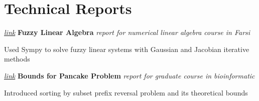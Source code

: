 \section{Technical Reports}
\begin{twocolentry}{
		\textit{\textit{\href{https://github.com/mehrdad3301/fuzzy-linear-algebra/blob/main/main.pdf}{link}}}}
	\textbf{Fuzzy Linear Algebra}
	\textit{report for numerical linear algebra course in Farsi}
\end{twocolentry}

\begin{onecolentry}
	Used Sympy to solve fuzzy linear systems with Gaussian and Jacobian iterative methods 
\end{onecolentry}

\vspace{0.2 cm}
\begin{twocolentry}{
		\textit{\href{https://github.com/mehrdad3301/pancake-bounds/blob/main/pancakes.pdf}{link}}}
	\textbf{Bounds for Pancake Problem} \textit{report for graduate course in bioinformatic}
\end{twocolentry}

\begin{onecolentry}
	Introduced sorting by subset prefix reversal problem and its theoretical bounds
\end{onecolentry}

